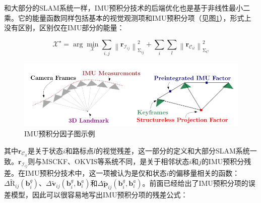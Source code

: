 和大部分的SLAM系统一样，IMU预积分技术的后端优化也是基于非线性最小二乘。它的能量函数同样包括基本的视觉观测项和IMU预积分项（见图\ref{fig:preint}），形式上没有区别，区别仅在IMU部分的能量：

\begin{equation}\label{eq:gtsam_res}
    \bm{\mathcal X}^\star =
        \arg\mathop{\min}_{\bm{\mathcal X}}
        \sum_{i,j}\left\| \mathbf{r}_{\mathcal{I}_{ij}} \right\|^2_{\mathrm\Sigma_{ij}} +
        \sum_{i} \sum_{l} \left\| \mathbf{r}_{\mathcal{C}_{il}} \right\|^2_{\mathrm\Sigma_{C}}
\end{equation}

\begin{figure}[htb!]
    \centering
    \includegraphics[width=.8\textwidth]{./figs/preint.png}
    \caption{IMU预积分因子图示例\citep{forster2017manifold}}
    \label{fig:preint}
\end{figure}

其中$\mathbf{r}_{\mathcal{C}_{il}}$是关于状态$i$和路标点$l$的视觉残差，这一部分的定义和大部分SLAM系统一致。$\mathbf{r}_{\mathcal{I}_{ij}}$则与MSCKF、OKVIS等系统不同，是关于相邻状态$i$和$j$的IMU预积分残差。在IMU预积分技术中，这一项被认为是仅和状态$i$的偏移量相关的函数：$\Delta\tilde{\mathrm R}_{ij}(\mathbf{b}^g_i)$、$\Delta\tilde{\mathbf v}_{ij}(\mathbf{b}^g_i, \mathbf{b}^a_i)$和$\Delta\tilde{\mathbf p}_{ij}(\mathbf{b}^g_i, \mathbf{b}^a_i)$。前面已经给出了IMU预积分项的误差模型，因此可以很容易地写出IMU预积分项的残差公式：

